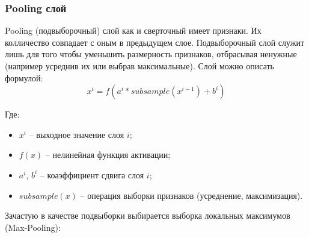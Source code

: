 \subsubsection{Pooling слой}

Pooling (подвыборочный) слой как и сверточный имеет признаки. Их колличество совпадает с оным в предыдущем слое. Подвыборочный слой служит лишь для того чтобы уменьшить размерность признаков, отбрасывая ненужные (например усреднив их или выбрав максимальные). Слой можно описать формулой:
$$
x^i = f(a^i*subsample(x^{i-1})+b^i)
$$

Где:
\begin{itemize}
    \item $x^i$ -- выходное значение слоя $i$;
    \item $f(x)$ -- нелинейная функция активации;
    \item $a^i$, $b^i$ -- коаэффициент сдвига слоя $i$;
    \item $subsample(x)$ -- операция выборки признаков (усреднение, максимизация).
\end{itemize}

Зачастую в качестве подвыборки выбирается выборка локальных максимумов (Max-Pooling):

